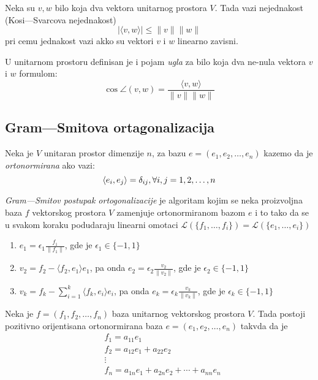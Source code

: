 \documentclass[12p,a4paper]{article}
\begin{document}
\begin{multicols}{2}
    Neka su $v, w$ bilo koja dva vektora unitarnog prostora $V$. Tada vazi 
    nejednakost (Kosi---Svarcova nejednakost)
    \[ | \langle v, w \rangle | \leq \|v\| \|w\| \]
    pri cemu jednakost vazi akko su vektori $v$ i $w$ linearno zavisni.

    U unitarnom prostoru definisan je i pojam \textit{ugla} za bilo koja dva 
    ne-nula vektora $v$ i $w$ formulom:
    \[
        \cos \angle (v, w) = \frac{\langle v, w \rangle}{\|v\| \|w\|}
    \]

\subsection{Gram---Smitova ortagonalizacija}

    Neka je $V$ unitaran prostor dimenzije $n$, za bazu 
    $e = (e_1, e_2, \ldots, e_n)$ kazemo da je \textit{ortonormirana} ako vazi:
    \[\langle e_i, e_j \rangle = \delta_{ij}, \\ \forall i,j = 1,2,\ldots, n\]

    \textit{Gram---Smitov postupak ortogonalizacije} je algoritam kojim se 
    neka proizvoljna baza $f$ vektorskog prostora $V$ zamenjuje ortonormiranom 
    bazom $e$ i to tako da se u svakom koraku podudaraju linearni omotaci 
    $\mathcal{L}(\{ f_1, \ldots, f_i\}) = \mathcal{L}(\{ e_1, \ldots, e_i \})$

    \begin{enumerate}
        \itemsep0em
        \item $e_1 = \epsilon_1 \frac{f_1}{\| f_1 \|}$, gde je 
            $\epsilon_1 \in \{-1, 1\}$
        \item $v_2 = f_2 - \langle f_2, e_1 \rangle e_1$, pa onda
            $e_2 = \epsilon_2 \frac{v_2}{\| v_2 \|}$, gde je 
            $\epsilon_2 \in \{-1, 1\}$
        \item $v_k = f_k - \sum_{i=1}^k \langle f_k, e_i \rangle e_i$, pa onda
            $e_k = \epsilon_k \frac{v_k}{\| v_k \|}$, gde je 
            $\epsilon_k \in \{-1, 1\}$
    \end{enumerate}

    Neka je $f = (f_1, f_2, \ldots, f_n)$ baza unitarnog vektorskog prostora 
    $V$. Tada postoji pozitivno orijentisana ortonormirana baza 
    $e=(e_1, e_2, \ldots, e_n)$ takvda da je
    \begin{align*}
        & f_1 = a_{11} e_1 \\
        & f_2 = a_{12} e_1 + a_{22} e_2 \\
        & \vdots \\
        & f_n = a_{1n} e_1 + a_{2n} e_2 + \cdots + a_{nn} e_n
    \end{align*}


\end{multicols}
\end{document}
